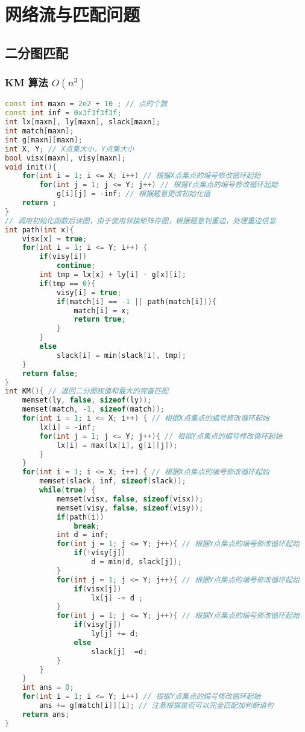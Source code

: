 

\section{网络流与匹配问题}

\subsection{二分图匹配}

\subsubsection{KM 算法 $O(n ^ 3)$}

\begin{lstlisting}[language=C++]
const int maxn = 2e2 + 10 ; // 点的个数
const int inf = 0x3f3f3f3f;
int lx[maxn], ly[maxn], slack[maxn];
int match[maxn];
int g[maxn][maxn];
int X, Y; // X点集大小，Y点集大小
bool visx[maxn], visy[maxn];
void init(){
    for(int i = 1; i <= X; i++) // 根据X点集点的编号修改循环起始
        for(int j = 1; j <= Y; j++) // 根据Y点集点的编号修改循环起始
            g[i][j] = -inf; // 根据题意更改初始化值
    return ;
}
// 调用初始化函数后读图，由于使用邻接矩阵存图，根据题意判重边，处理重边信息
int path(int x){
    visx[x] = true;
    for(int i = 1; i <= Y; i++) {
        if(visy[i])
            continue;
        int tmp = lx[x] + ly[i] - g[x][i];
        if(tmp == 0){
            visy[i] = true;
            if(match[i] == -1 || path(match[i])){
                match[i] = x;
                return true;
            }
        }
        else
            slack[i] = min(slack[i], tmp);
    }
    return false;
}
int KM(){ // 返回二分图权值和最大的完备匹配
    memset(ly, false, sizeof(ly));
    memset(match, -1, sizeof(match));
    for(int i = 1; i <= X; i++) { // 根据X点集点的编号修改循环起始
        lx[i] = -inf;
        for(int j = 1; j <= Y; j++){ // 根据Y点集点的编号修改循环起始
            lx[i] = max(lx[i], g[i][j]);
        }
    }
    for(int i = 1; i <= X; i++) { // 根据X点集点的编号修改循环起始
        memset(slack, inf, sizeof(slack));
        while(true) {
            memset(visx, false, sizeof(visx));
            memset(visy, false, sizeof(visy));
            if(path(i))
                break;
            int d = inf;
            for(int j = 1; j <= Y; j++){ // 根据Y点集点的编号修改循环起始
                if(!visy[j])
                    d = min(d, slack[j]);
            }
            for(int j = 1; j <= Y; j++){ // 根据Y点集点的编号修改循环起始
                if(visx[j])
                    lx[j] -= d ;
            }
            for(int j = 1; j <= Y; j++){ // 根据Y点集点的编号修改循环起始
                if(visy[j])
                    ly[j] += d;
                else
                    slack[j] -=d;
            }
        }
    }
    int ans = 0;
    for(int i = 1; i <= Y; i++) // 根据Y点集点的编号修改循环起始
        ans += g[match[i]][i]; // 注意根据是否可以完全匹配加判断语句
    return ans;
}
\end{lstlisting}

